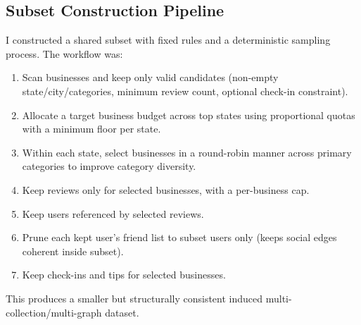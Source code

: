 \documentclass[11pt,a4paper]{article}
\begin{document}
\subsection*{Subset Construction Pipeline}
I constructed a shared subset with fixed rules and a deterministic sampling process. The workflow was:
\begin{enumerate}
    \item Scan businesses and keep only valid candidates (non-empty state/city/categories, minimum review count, optional check-in constraint).
    \item Allocate a target business budget across top states using proportional quotas with a minimum floor per state.
    \item Within each state, select businesses in a round-robin manner across primary categories to improve category diversity.
    \item Keep reviews only for selected businesses, with a per-business cap.
    \item Keep users referenced by selected reviews.
    \item Prune each kept user's friend list to subset users only (keeps social edges coherent inside subset).
    \item Keep check-ins and tips for selected businesses.
\end{enumerate}

This produces a smaller but structurally consistent induced multi-collection/multi-graph dataset.
\end{document}

